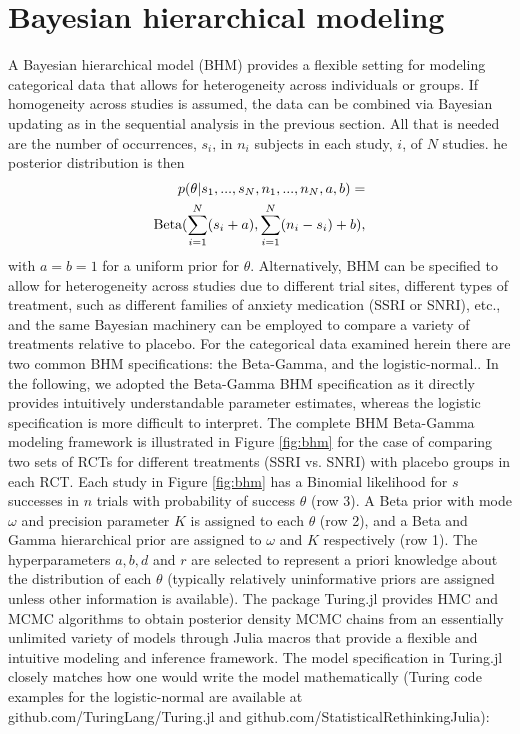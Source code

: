 \documentclass{juliacon}
\begin{document}
\section{Bayesian hierarchical modeling}
\label{sec:hbm}
A Bayesian hierarchical model (BHM) provides a flexible setting for modeling categorical data that allows for heterogeneity across individuals or groups. If homogeneity across studies is assumed, the data can be combined via Bayesian updating as in the sequential analysis in the previous section.  All that is needed are the number of occurrences, $s_i$, in $n_i$ subjects in each study, $i$, of $N$ studies.  he posterior distribution is then 
\begin{equation}
\begin{split}
p(\theta | s_1,...,s_N, n_1,...,n_N,a,b) = \\ \textnormal{Beta}(\sum_{i=1}^N (s_i +a),\sum_{i=1}^N(n_i - s_i) + b),
\end{split}
\label{eq:pbeta}
\end{equation}
with $a=b=1$ for a uniform prior for $\theta$.
\vskip 6pt
Alternatively, BHM can be specified to allow for heterogeneity across studies due to different trial sites, different types of treatment, such as different families of anxiety medication (SSRI or SNRI), etc., and the same Bayesian machinery can be employed to compare a variety of treatments relative to placebo. For the categorical data examined herein there are two common BHM specifications: the Beta-Gamma,\cite{Kruschke2014} and the logistic-normal.\cite{Mcelreath2015}.  In the following, we adopted the Beta-Gamma BHM specification as it directly provides intuitively understandable parameter estimates, whereas the logistic specification is more difficult to interpret.
\vskip 6pt
The complete BHM Beta-Gamma modeling framework is illustrated in Figure \ref{fig:bhm} for the case of comparing two sets of RCTs for different treatments (SSRI vs. SNRI) with placebo groups in each RCT. Each study in Figure \ref{fig:bhm} has a Binomial likelihood for $s$ successes in $n$ trials with probability of success $\theta$ (row 3).  A Beta prior with mode $\omega$ and precision parameter $K$ is assigned to each $\theta$ (row 2), and a Beta and Gamma hierarchical prior are assigned to $\omega$ and $K$ respectively (row 1). The hyperparameters $a,b,d$ and $r$ are selected to represent a priori knowledge about the distribution of each $\theta$ (typically relatively uninformative priors are assigned unless other information is available).
\vskip 6pt
The package Turing.jl provides HMC and MCMC algorithms to obtain posterior density MCMC chains from an essentially unlimited variety of models through Julia macros that provide a flexible and intuitive modeling and inference framework. The model specification in Turing.jl closely matches how one would write the model mathematically (Turing code examples for the logistic-normal are available at github.com/TuringLang/Turing.jl and github.com/StatisticalRethinkingJulia):
\end{document}
